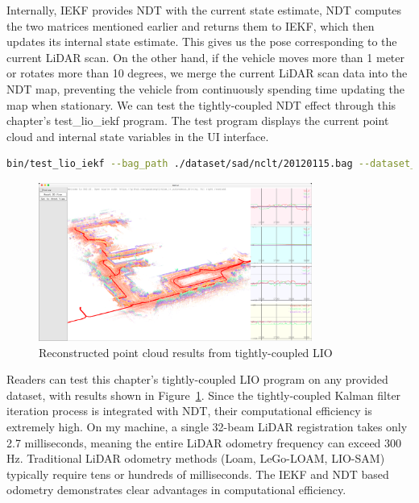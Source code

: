 Internally, IEKF provides NDT with the current state estimate, NDT computes the two matrices mentioned earlier and returns them to IEKF, which then updates its internal state estimate. This gives us the pose corresponding to the current LiDAR scan. On the other hand, if the vehicle moves more than 1 meter or rotates more than 10 degrees, we merge the current LiDAR scan data into the NDT map, preventing the vehicle from continuously spending time updating the map when stationary. We can test the tightly-coupled NDT effect through this chapter's test\_lio\_iekf program. The test program displays the current point cloud and internal state variables in the UI interface.

\begin{lstlisting}[language=sh,caption=Terminal input:]
bin/test_lio_iekf --bag_path ./dataset/sad/nclt/20120115.bag --dataset_type NCLT --config ./config/velodyne_nclt.yaml
\end{lstlisting}

\begin{figure}[!htp]
	\centering
	\includegraphics[width=0.8\textwidth]{resources/lio/tightly-lio.png}
	\caption{Reconstructed point cloud results from tightly-coupled LIO}
	\label{fig:tightly-lio}
\end{figure}

Readers can test this chapter's tightly-coupled LIO program on any provided dataset, with results shown in Figure~\ref{fig:tightly-lio}. Since the tightly-coupled Kalman filter iteration process is integrated with NDT, their computational efficiency is extremely high. On my machine, a single 32-beam LiDAR registration takes only 2.7 milliseconds, meaning the entire LiDAR odometry frequency can exceed 300 Hz. Traditional LiDAR odometry methods (Loam\cite{Zhang2014}, LeGo-LOAM\cite{Shan2018}, LIO-SAM\cite{Shan2020}) typically require tens or hundreds of milliseconds. The IEKF and NDT based odometry demonstrates clear advantages in computational efficiency.

